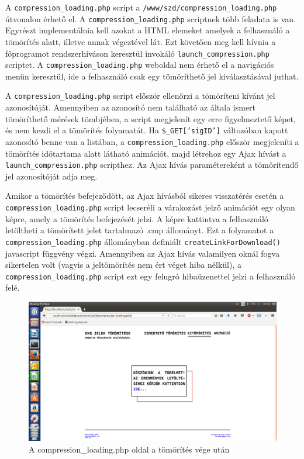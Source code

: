 \documentclass[oneside,titlepage,12pt,a4paper]{report}
\begin{document}
A \texttt{compression\_loading.php} script a \texttt{/www/szd/compression\_loading.php} útvonalon érhető el. A \texttt{compression\_loading.php} scriptnek több feladata is van. Egyrészt implementálnia kell azokat a HTML elemeket amelyek a felhasználó a tömörítés alatt, illetve annak végeztével lát. Ezt követően meg kell hívnia a főprogramot \linebreak rendszerhíváson keresztül invokáló \texttt{launch\_compression.php} scriptet. \linebreak A \texttt{compression\_loading.php} weboldal nem érhető el a navigációs menün keresztül, ide a felhasználó csak egy tömöríthető jel kiválasztásával juthat. 
\par A \texttt{compression\_loading.php} script először ellenőrzi a tömöríteni kívánt jel azonosítóját. Amennyiben az azonosító nem található az általa ismert tömöríthető mérések tömbjében, a script megjelenít egy erre figyelmeztető képet, és nem kezdi el a tömörítés folyamatát. Ha \texttt{\$\_GET['sigID']} változóban kapott azonosító benne van a listában, a \texttt{compression\_loading.php} először megjeleníti a tömörítés időtartama alatt látható animációt, majd létrehoz egy Ajax hívást a \texttt{launch\_compression.php} scripthez. Az Ajax hívás paramétereként a tömörítendő jel azonosítóját adja meg. 
\par Amikor a tömörítés befejeződött, az Ajax hívásból sikeres visszatérés esetén a \texttt{compression\_loading.php} script lecseréli a várakozást jelző animációt egy olyan képre, amely a tömörítés befejezését jelzi. A képre kattintva a felhasználó letöltheti a tömörített jelet tartalmazó .cmp állományt. Ezt a folyamatot a \texttt{compression\_loading.php} állományban definiált \texttt{createLinkForDownload()} javascript függvény végzi. Amennyiben az Ajax hívás valamilyen oknál fogva sikertelen volt (vagyis a jeltömörítés nem ért véget hiba nélkül), a \texttt{compression\_loading.php} script ezt egy felugró hibaüzenettel jelzi a felhasználó felé.

\begin{figure}[H]
\begin{center}
  \includegraphics[width=150mm]{./Abrak/WWW/comp_loading.png}
  \caption{A compression\_loading.php oldal a tömörítés vége után}
\end{center}
\end{figure}
\end{document}

